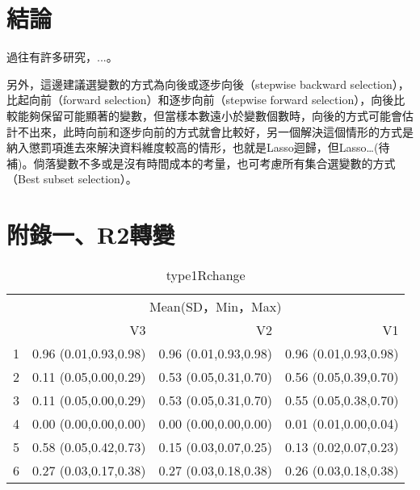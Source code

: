 \section{結論}
過往有許多研究，...。\par
另外，這邊建議選變數的方式為向後或逐步向後（stepwise backward selection），比起向前（forward selection）和逐步向前（stepwise forward selection），向後比較能夠保留可能顯著的變數，但當樣本數遠小於變數個數時，向後的方式可能會估計不出來，此時向前和逐步向前的方式就會比較好，另一個解決這個情形的方式是納入懲罰項進去來解決資料維度較高的情形，也就是Lasso迴歸，但Lasso…(待補)。倘落變數不多或是沒有時間成本的考量，也可考慮所有集合選變數的方式（Best subset selection）。\par

\newpage 
{} 
\printbibliography[title=參考書目]
\newpage 
\section*{附錄一、R2轉變}
\begin{table}[h]
\centering
\caption{type1Rchange}
\label{tab:type1changeR}
\begin{tabular}{crrr}
\toprule
      & \multicolumn{3}{c}{Mean(SD，Min，Max)} \\
\cmidrule{2-4}      & V3    & V2    & V1 \\
\midrule
1     & 0.96 (0.01,0.93,0.98) & 0.96 (0.01,0.93,0.98) & 0.96 (0.01,0.93,0.98) \\
2     & 0.11 (0.05,0.00,0.29) & 0.53 (0.05,0.31,0.70) & 0.56 (0.05,0.39,0.70) \\
3     & 0.11 (0.05,0.00,0.29) & 0.53 (0.05,0.31,0.70) & 0.55 (0.05,0.38,0.70) \\
4     & 0.00 (0.00,0.00,0.00) & 0.00 (0.00,0.00,0.00) & 0.01 (0.01,0.00,0.04) \\
5     & 0.58 (0.05,0.42,0.73) & 0.15 (0.03,0.07,0.25) & 0.13 (0.02,0.07,0.23) \\
6     & 0.27 (0.03,0.17,0.38) & 0.27 (0.03,0.18,0.38) & 0.26 (0.03,0.18,0.38) \\
\bottomrule
\end{tabular}
\end{table}
     
